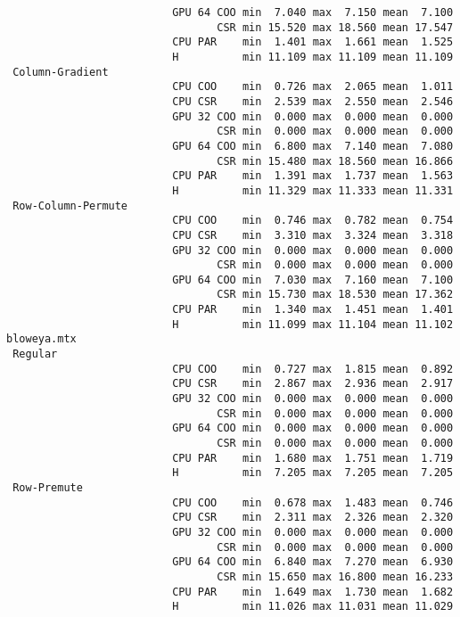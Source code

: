 \begin{verbatim}
                          GPU 64 COO min  7.040 max  7.150 mean  7.100
                                 CSR min 15.520 max 18.560 mean 17.547
                          CPU PAR    min  1.401 max  1.661 mean  1.525
                          H          min 11.109 max 11.109 mean 11.109
 Column-Gradient
                          CPU COO    min  0.726 max  2.065 mean  1.011
                          CPU CSR    min  2.539 max  2.550 mean  2.546
                          GPU 32 COO min  0.000 max  0.000 mean  0.000
                                 CSR min  0.000 max  0.000 mean  0.000
                          GPU 64 COO min  6.800 max  7.140 mean  7.080
                                 CSR min 15.480 max 18.560 mean 16.866
                          CPU PAR    min  1.391 max  1.737 mean  1.563
                          H          min 11.329 max 11.333 mean 11.331
 Row-Column-Permute
                          CPU COO    min  0.746 max  0.782 mean  0.754
                          CPU CSR    min  3.310 max  3.324 mean  3.318
                          GPU 32 COO min  0.000 max  0.000 mean  0.000
                                 CSR min  0.000 max  0.000 mean  0.000
                          GPU 64 COO min  7.030 max  7.160 mean  7.100
                                 CSR min 15.730 max 18.530 mean 17.362
                          CPU PAR    min  1.340 max  1.451 mean  1.401
                          H          min 11.099 max 11.104 mean 11.102
bloweya.mtx
 Regular
                          CPU COO    min  0.727 max  1.815 mean  0.892
                          CPU CSR    min  2.867 max  2.936 mean  2.917
                          GPU 32 COO min  0.000 max  0.000 mean  0.000
                                 CSR min  0.000 max  0.000 mean  0.000
                          GPU 64 COO min  0.000 max  0.000 mean  0.000
                                 CSR min  0.000 max  0.000 mean  0.000
                          CPU PAR    min  1.680 max  1.751 mean  1.719
                          H          min  7.205 max  7.205 mean  7.205
 Row-Premute
                          CPU COO    min  0.678 max  1.483 mean  0.746
                          CPU CSR    min  2.311 max  2.326 mean  2.320
                          GPU 32 COO min  0.000 max  0.000 mean  0.000
                                 CSR min  0.000 max  0.000 mean  0.000
                          GPU 64 COO min  6.840 max  7.270 mean  6.930
                                 CSR min 15.650 max 16.800 mean 16.233
                          CPU PAR    min  1.649 max  1.730 mean  1.682
                          H          min 11.026 max 11.031 mean 11.029

\end{verbatim}
